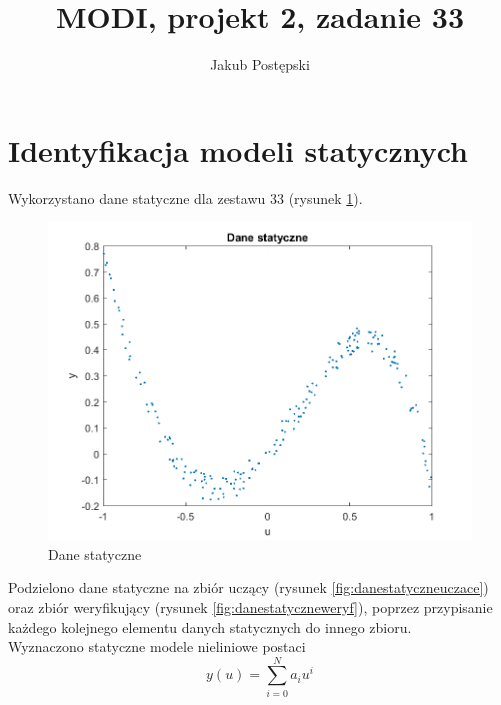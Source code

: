 \documentclass{article}
\author{Jakub Postępski}
\title{MODI, projekt 2, zadanie 33}
\begin{document}
\maketitle
\section{Identyfikacja modeli statycznych}
Wykorzystano dane statyczne dla zestawu 33 (rysunek \ref{fig:danestatyczne}).
\begin{figure}
\centering
\includegraphics[width=0.95\linewidth]{dane_statyczne}
\caption{Dane statyczne}
\label{fig:danestatyczne}
\end{figure}

Podzielono dane statyczne na zbiór uczący (rysunek \ref{fig:danestatyczneuczace}) oraz zbiór weryfikujący (rysunek \ref{fig:danestatyczneweryf}), poprzez przypisanie każdego kolejnego elementu danych statycznych do innego zbioru.\\
Wyznaczono statyczne modele nieliniowe postaci
\[y(u) = \sum_{i = 0}^{N}a_i u^i\]
\end{document}

